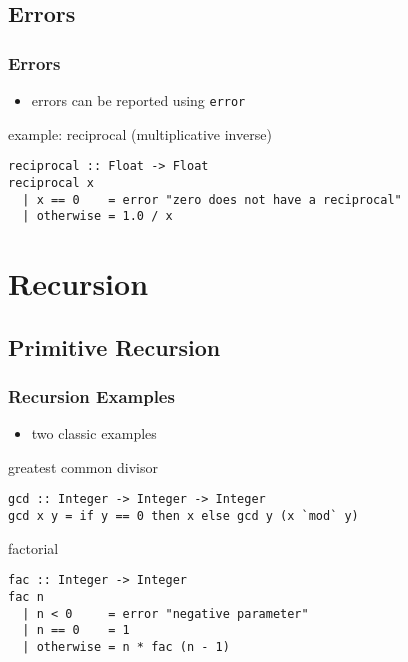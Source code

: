 \documentclass[dvipsnames]{beamer}
\theoremstyle{plain}
\begin{document}
\subsection{Errors}

\begin{frame}[fragile]
  \frametitle{Errors}

  \begin{itemize}
    \item errors can be reported using \lstinline|error|
  \end{itemize}

  \begin{exampleblock}{example: reciprocal (multiplicative inverse)}
    \begin{lstlisting}
reciprocal :: Float -> Float
reciprocal x
  | x == 0    = error "zero does not have a reciprocal"
  | otherwise = 1.0 / x
    \end{lstlisting}
  \end{exampleblock}
\end{frame}

\section{Recursion}


\subsection{Primitive Recursion}

\begin{frame}[fragile]
  \frametitle{Recursion Examples}

  \begin{itemize}
    \item two classic examples
  \end{itemize}

  \begin{exampleblock}{greatest common divisor}
    \begin{lstlisting}
gcd :: Integer -> Integer -> Integer
gcd x y = if y == 0 then x else gcd y (x `mod` y)
    \end{lstlisting}
  \end{exampleblock}

  \begin{exampleblock}{factorial}
    \begin{lstlisting}
fac :: Integer -> Integer
fac n
  | n < 0     = error "negative parameter"
  | n == 0    = 1
  | otherwise = n * fac (n - 1)
    \end{lstlisting}
  \end{exampleblock}
\end{frame}
\end{document}
